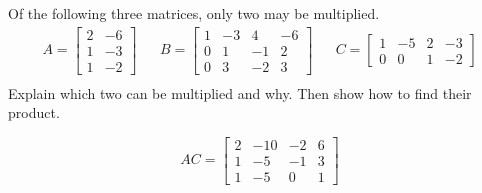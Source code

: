 
\begin{exerciseStatement}


Of the following three matrices, only two may be multiplied. 
\begin{align*} A= \left[\begin{array}{cc}
2 & -6 \\
1 & -3 \\
1 & -2
\end{array}\right]  & & B= \left[\begin{array}{cccc}
1 & -3 & 4 & -6 \\
0 & 1 & -1 & 2 \\
0 & 3 & -2 & 3
\end{array}\right]  & & C= \left[\begin{array}{cccc}
1 & -5 & 2 & -3 \\
0 & 0 & 1 & -2
\end{array}\right]  \\ \end{align*}
             Explain which two can be multiplied and why. Then show how to find their product.


\end{exerciseStatement}
    
\begin{exerciseAnswer} 
\[AC= \left[\begin{array}{cccc}
2 & -10 & -2 & 6 \\
1 & -5 & -1 & 3 \\
1 & -5 & 0 & 1
\end{array}\right] \]
\end{exerciseAnswer}
    
